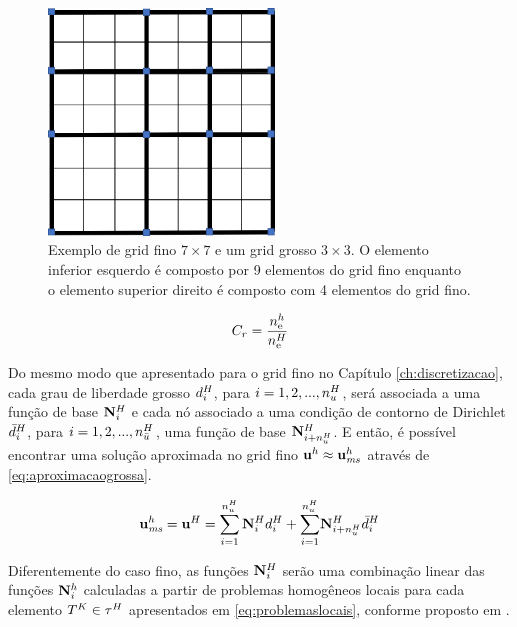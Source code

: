 \begin{figure}[!htbp]
\centering
\includegraphics[width=6cm]{chap06/figs/grosso.png}
\caption{Exemplo de grid fino $7\times 7$ e um grid grosso $3\times 3$. O elemento inferior esquerdo é composto por 9 elementos do grid fino enquanto o elemento superior direito é composto com 4 elementos do grid fino.}
\label{fig:gridgrosso}
\end{figure}


\begin{equation} \label{eq:fatordeengrossamento}
    C_r = \frac{n_{\text{e}}^h}{n_{\text{e}}^H}
\end{equation}




Do mesmo modo que apresentado para o grid fino no Capítulo \ref{ch:discretizacao}, cada grau de liberdade grosso $d^H_{i}$, para $i=1, 2,..., n_u^H$, será associada a uma função de base $\mathbf{N}_{i}^H$ e cada nó associado a uma condição de contorno de Dirichlet $\bar{d}^H_{i}$, para  $i=1, 2,..., n_{\bar{u}}^H$,  uma função de base ${\mathbf{N}_{i+n_u^H}^H}$. E então, é possível encontrar uma solução aproximada no grid fino $\mathbf{u}^h \approx \mathbf{u}^h_{\textit{ms}}$ através de \eqref{eq:aproximacaogrossa}.

\begin{equation} \label{eq:aproximacaogrossa}
    \mathbf{u}^h_{\textit{ms}} = \mathbf{u}^H = \sum_{i=1}^{n_u^H} \mathbf{N}_{i}^H d^H_{i} + {\sum_{i=1}^ {n_u^H}}  {\mathbf{N}_{i+n_u^H}^H} \bar{d}^H_{i}
\end{equation}

Diferentemente do caso fino, as funções $\mathbf{N}_{i}^H$ serão uma combinação linear das funções ${\mathbf{N}_{i}^h}$ calculadas a partir de problemas homogêneos locais  para cada elemento $T^K \in \tau^H$  apresentados em \eqref{eq:problemaslocais}, conforme proposto em \cite{casteletto}.


